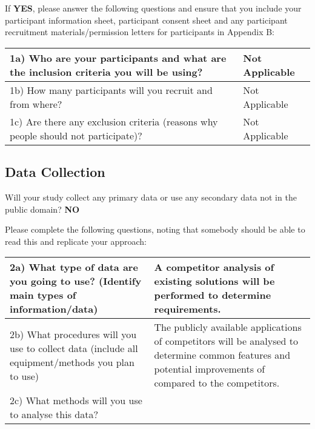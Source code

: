 \documentclass[../CHEFCookingHelperForEveryonesFridge.tex]{subfiles}
\begin{document}
If \textbf{YES}, please answer the following questions and ensure that you include your participant
information sheet, participant consent sheet and any participant recruitment materials/permission
letters for participants in Appendix B:

\begin{table}[h!]
    \begin{tabulary}{\textwidth}{|L|L|}
        \hline
        1a) Who are your participants and what are the inclusion criteria you will be using? & Not Applicable \\\hline
        1b) How many participants will you recruit and from where? & Not Applicable \\\hline
        1c) Are there any exclusion criteria (reasons why people should not participate)? & Not Applicable \\\hline
    \end{tabulary}
\end{table}

\subsection{Data Collection}
Will your study collect any primary data or use any secondary data not in the public domain? \textbf{NO}

Please complete the following questions, noting that somebody should be able to read this and replicate your approach:

\begin{table}[h!]
    \begin{tabulary}{\textwidth}{|L|L|}
        \hline
        2a) What type of data are you going to use? (Identify main types of information/data)
            &
        A competitor analysis of existing solutions will be performed to determine requirements.
            \\\hline
        2b) What procedures will you use to collect data (include all equipment/methods you plan to use)
            &
        The publicly available applications of competitors will be analysed to determine common features and potential improvements of \chef{} compared to the competitors.
            \\\hline
        2c) What methods will you use to analyse this data?
            &
            \\\hline
    \end{tabulary}
\end{table}
\end{document}
